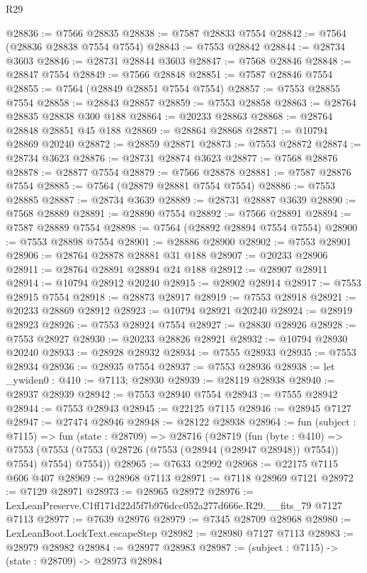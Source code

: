 \begin{lexlean}{R29}
\begin{coremodule}
@28836 := @7566 @28835
@28838 := @7587 @28833 @7554
@28842 := @7564 (@28836 @28838 @7554 @7554)
@28843 := @7553 @28842
@28844 := @28734 @3603
@28846 := @28731 @28844 @3603
@28847 := @7568 @28846
@28848 := @28847 @7554
@28849 := @7566 @28848
@28851 := @7587 @28846 @7554
@28855 := @7564 (@28849 @28851 @7554 @7554)
@28857 := @7553 @28855 @7554
@28858 := @28843 @28857
@28859 := @7553 @28858
@28863 := @28764 @28835 @28838 @300 @188
@28864 := @20233 @28863
@28868 := @28764 @28848 @28851 @45 @188
@28869 := @28864 @28868
@28871 := @10794 @28869 @20240
@28872 := @28859 @28871
@28873 := @7553 @28872
@28874 := @28734 @3623
@28876 := @28731 @28874 @3623
@28877 := @7568 @28876
@28878 := @28877 @7554
@28879 := @7566 @28878
@28881 := @7587 @28876 @7554
@28885 := @7564 (@28879 @28881 @7554 @7554)
@28886 := @7553 @28885
@28887 := @28734 @3639
@28889 := @28731 @28887 @3639
@28890 := @7568 @28889
@28891 := @28890 @7554
@28892 := @7566 @28891
@28894 := @7587 @28889 @7554
@28898 := @7564 (@28892 @28894 @7554 @7554)
@28900 := @7553 @28898 @7554
@28901 := @28886 @28900
@28902 := @7553 @28901
@28906 := @28764 @28878 @28881 @31 @188
@28907 := @20233 @28906
@28911 := @28764 @28891 @28894 @24 @188
@28912 := @28907 @28911
@28914 := @10794 @28912 @20240
@28915 := @28902 @28914
@28917 := @7553 @28915 @7554
@28918 := @28873 @28917
@28919 := @7553 @28918
@28921 := @20233 @28869 @28912
@28923 := @10794 @28921 @20240
@28924 := @28919 @28923
@28926 := @7553 @28924 @7554
@28927 := @28830 @28926
@28928 := @7553 @28927
@28930 := @20233 @28826 @28921
@28932 := @10794 @28930 @20240
@28933 := @28928 @28932
@28934 := @7555 @28933
@28935 := @7553 @28934
@28936 := @28935 @7554
@28937 := @7553 @28936
@28938 := let _ywiden0 : @410 := @7113; @28930
@28939 := @28119 @28938
@28940 := @28937 @28939
@28942 := @7553 @28940 @7554
@28943 := @7555 @28942
@28944 := @7553 @28943
@28945 := @22125 @7115
@28946 := @28945 @7127
@28947 := @27474 @28946
@28948 := @28122 @28938
@28964 := fun (subject : @7115) =>
  fun (state : @28709) =>
  @28716
    (@28719
      (fun (byte : @410) =>
      @7553 (@7553 (@7553 (@28726 (@7553 (@28944 (@28947 @28948)) @7554)) @7554) @7554) @7554))
@28965 := @7633 @2992
@28968 := @22175 @7115 @606 @407
@28969 := @28968 @7113
@28971 := @7118 @28969 @7121
@28972 := @7129 @28971
@28973 := @28965 @28972
@28976 := LexLeanPreserve.C1ff171d22d5f7b976dcc052a277d666e.R29.__fits_79 @7127 @7113
@28977 := @7639 @28976
@28979 := @7345 @28709 @28968
@28980 := LexLeanBoot.LockText.escapeStep
@28982 := @28980 @7127 @7113
@28983 := @28979 @28982
@28984 := @28977 @28983
@28987 := (subject : @7115) -> (state : @28709) -> @28973 @28984

\end{coremodule}
\end{lexlean}
